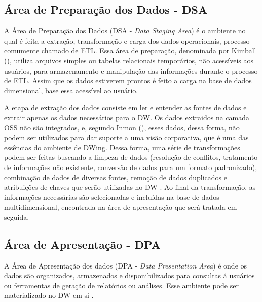 \subsection{Área de Preparação dos Dados - DSA}

A Área de Preparação dos Dados (DSA - \emph{Data Staging Area}) é o ambiente no qual é feita a extração, transformação e carga dos dados operacionais, processo comumente chamado de ETL. Essa área de preparação, denominada por Kimball (\citeyear{kimball2002}), utiliza arquivos simples ou tabelas relacionais temporários, não acessíveis aos usuários, para armazenamento e manipulação das informações durante o processo de ETL. Assim que os dados estiverem prontos é feito a carga na base de dados dimensional, base essa acessível ao usuário.

%

A etapa de extração dos dados consiste em ler e entender as fontes de dados e extrair apenas os dados necessários para o DW. Os dados extraidos na camada OSS não são integrados, e, segundo Inmon (\citeyear{inmon2002}), esses dados, dessa forma, não podem ser utilizados para dar suporte a uma visão corporativa, que é uma das essências do ambiente de DWing. Dessa forma, uma série de transformações podem ser feitas buscando a limpeza de dados (resolução de conflitos, tratamento de informações não existente, conversão de dados para um formato padronizado), combinação de dados de diversas fontes, remoção de dados duplicados e atribuições de chaves que serão utilizadas no DW \cite{kimball2002}. Ao final da transformação, as informações necessárias são selecionadas e incluídas na base de dados multidimensional, encontrada na área de apresentação que será tratada em seguida.

\subsection{Área de Apresentação - DPA}

A Área de Apresentação dos dados (DPA - \emph{Data Presentation Area}) é onde os dados são organizados, armazenados e disponibilizados para consultas á usuários ou ferramentas de geração de relatórios ou análises. Esse ambiente pode ser materializado no DW em si \cite{kimball2002}. 

%


